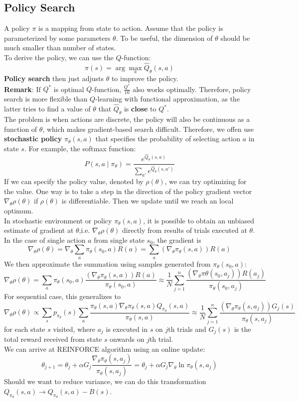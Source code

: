 \documentclass[12pt]{article}
\theoremstyle{definition}
\begin{document}
\subsection{Policy Search}
A policy $\pi$ is a mapping from state to action. Assume that the policy is parameterized by some parameters $\theta$. To be useful, the dimension of $\theta$ should be much smaller than number of states.\\
To derive the policy, we can use the $Q$-function:
\[
\pi(s)=\arg\max_a\hat{Q}_\theta(s,a)
\]
\textbf{Policy search} then just adjusts $\theta$ to improve the policy.\\
\textbf{Remark}: If $Q^\ast$ is optimal $Q$-function, $\frac{Q^\ast}{10}$ also works optimally. Therefore, policy search is more flexible than $Q$-learning with functional approximation, as the latter tries to find a value of $\theta$ that $\hat{Q}_\theta$ is \textbf{close} to $Q^\ast$.\\
The problem is when actions are discrete, the policy will also be continuous as a function of $\theta$, which makes gradient-based search difficult. Therefore, we offen use \textbf{stochastic policy} $\pi_\theta(s,a)$ that specifies the probability of selecting action $a$ in state $s$. For example, the softmax function:
\[
P(s,a\mid \pi_\theta)=\frac{e^{\hat{Q}_\theta(s,a)}}{\sum_{a'}e^{\hat{Q}_\theta(s,a')}}
\]
If we can specify the policy value, denoted by $\rho(\theta)$, we can try optimizing for the value. One way is to take a step in the direction of the policy gradient vector $\nabla_\theta \rho(\theta)$ if $\rho(\theta)$ is differentiable. Then we update until we reach an local optimum.\\
In stochastic environment or policy $\pi_\theta(s,a)$, it is possible to obtain an unbiased estimate of gradient at $\theta$,i.e. $\nabla_\theta \rho(\theta)$ directly from results of trials executed at $\theta$.\\
In the case of single action $a$ from single state $s_0$, the gradient is 
\[
\nabla_\theta \rho(\theta)=\nabla_\theta\sum_{a}\pi_\theta(s_0,a)R(a)=\sum_{a}(\nabla_\theta \pi_\theta(s,a))R(a)
\]
We then approximate the summation using samples generated from $\pi_\theta(s_0,a)$:
\[
\nabla_\theta\rho(\theta)=\sum_a \pi_\theta(s_0,a)\frac{(\nabla_\theta \pi_\theta(s,a))R(a)}{\pi_\theta(s_0,a)}\approx \frac{1}{N}\sum_{j=1}^n \frac{(\nabla_\theta\pi\theta(s_0,a_j))R(a_j)}{\pi_\theta(s_0, a_j)}
\]
For sequential case, this generalizes to
\[
\nabla_\theta\rho(\theta)\propto \sum_s p_{\pi_\theta}(s)\sum_{a}\frac{\pi_\theta(s,a)\nabla_\theta\pi_\theta(s,a) Q_{\pi_\theta}(s,a)}{\pi_\theta(s,a)}\approx \frac{1}{N}\sum_{j=1}^n \frac{(\nabla_\theta\pi_\theta(s,a_j))G_j(s)}{\pi_\theta(s,a_j)}
\]
for each state $s$ visited, where $a_j$ is executed in $s$ on $j$th trials and $G_j(s)$ is the total reward received from state $s$ onwards on $j$th trial. \\
We can arrive at REINFORCE algorithm using an online update:
\[
\theta_{j+1}=\theta_j+\alpha G_j\frac{\nabla_\theta\pi_\theta(s,a_j)}{\pi_\theta(s,a_j)}=\theta_j+\alpha G_j\nabla_\theta\ln\pi_\theta(s,a_j)
\]
Should we want to reduce variance, we can do this transformation $Q_{\pi_\theta}(s,a)\to Q_{\pi_\theta}(s,a)-B(s)$. 
\end{document}
